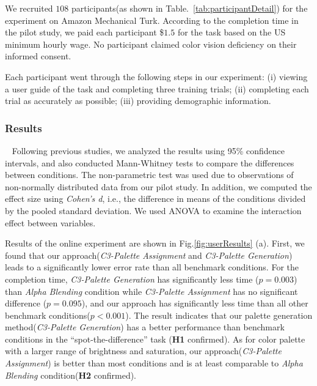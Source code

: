 \vspace{.3em}
We recruited $108$ participants(as shown in Table.~\ref{tab:participantDetail}) for the experiment on Amazon Mechanical Turk.
According to the completion time in the pilot study, we paid each participant \$$1.5$ for the task based on the US minimum hourly wage.
No participant claimed color vision deficiency on their informed consent.

\vspace{.3em}
Each participant went through the following steps in our experiment: (i) viewing a user guide of the task and completing three training trials; (ii) completing each trial as accurately as possible; (iii) providing demographic information.

\subsubsection{Results}
\
\newline
Following previous studies, we analyzed the results using 95\% confidence intervals, and also conducted Mann-Whitney tests to compare the differences between conditions. The non-parametric test was used due to observations of non-normally distributed data from our pilot study. In addition, we computed the effect size using \emph{Cohen's d}, i.e., the difference in means of the conditions divided by the pooled standard deviation. We used ANOVA to examine the interaction effect between variables.


Results of the online experiment are shown in Fig.\ref{fig:userResults} (a).
First, we found that our approach(\emph{C3-Palette Assignment} and \emph{C3-Palette Generation}) leads to a significantly lower error rate than all benchmark conditions. For the completion time, \emph{C3-Palette Generation} has significantly less time (\emph{$p = 0.003$}) than \emph{Alpha Blending} condition while \emph{C3-Palette Assignment} has no significant difference (\emph{$p = 0.095$}), and our approach has significantly less time than all other benchmark conditions(\emph{$p < 0.001$}). The result indicates that our palette generation method(\emph{C3-Palette Generation}) has a better performance than benchmark conditions in the ``spot-the-difference'' task (\textbf{H1} confirmed). As for color palette with a larger range of brightness and saturation, our approach(\emph{C3-Palette Assignment}) is better than most conditions and is at least comparable to \emph{Alpha Blending} condition(\textbf{H2} confirmed).


